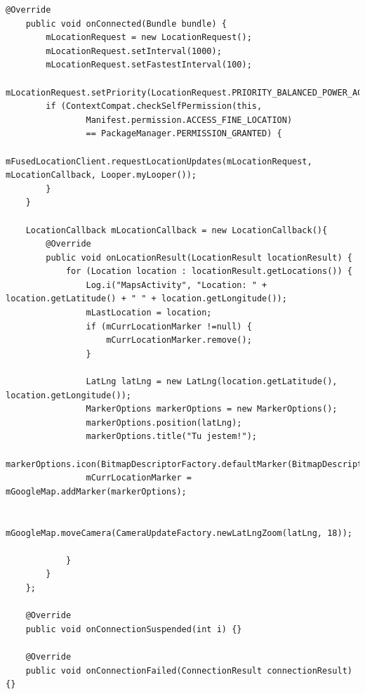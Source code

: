 \documentclass[a4paper]{article}
\begin{document}
\begin{lstlisting}[style=java]
    @Override
    public void onConnected(Bundle bundle) {
        mLocationRequest = new LocationRequest();
        mLocationRequest.setInterval(1000);
        mLocationRequest.setFastestInterval(100);
        mLocationRequest.setPriority(LocationRequest.PRIORITY_BALANCED_POWER_ACCURACY);
        if (ContextCompat.checkSelfPermission(this,
                Manifest.permission.ACCESS_FINE_LOCATION)
                == PackageManager.PERMISSION_GRANTED) {
            mFusedLocationClient.requestLocationUpdates(mLocationRequest, mLocationCallback, Looper.myLooper());
        }
    }

    LocationCallback mLocationCallback = new LocationCallback(){
        @Override
        public void onLocationResult(LocationResult locationResult) {
            for (Location location : locationResult.getLocations()) {
                Log.i("MapsActivity", "Location: " + location.getLatitude() + " " + location.getLongitude());
                mLastLocation = location;
                if (mCurrLocationMarker !=null) {
                    mCurrLocationMarker.remove();
                }

                LatLng latLng = new LatLng(location.getLatitude(), location.getLongitude());
                MarkerOptions markerOptions = new MarkerOptions();
                markerOptions.position(latLng);
                markerOptions.title("Tu jestem!");
                markerOptions.icon(BitmapDescriptorFactory.defaultMarker(BitmapDescriptorFactory.HUE_MAGENTA));
                mCurrLocationMarker = mGoogleMap.addMarker(markerOptions);

                mGoogleMap.moveCamera(CameraUpdateFactory.newLatLngZoom(latLng, 18));

            }
        }
    };

    @Override
    public void onConnectionSuspended(int i) {}

    @Override
    public void onConnectionFailed(ConnectionResult connectionResult) {}
\end{lstlisting}
\end{document}
